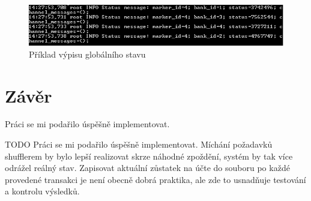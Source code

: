 \documentclass[11pt,a4paper]{scrartcl}
\begin{document}
	\begin{figure}[H]
		\centering
		\includegraphics[width=15cm]{img/global-state.png}
		\caption{Příklad výpisu globálního stavu}
		\label{fig:global-state}
	\end{figure}
	
	\section{Závěr}
	Práci se mi podařilo úspěšně implementovat.
	
	TODO
	Práci se mi podařilo úspěšně implementovat. Míchání požadavků shufflerem by bylo lepší realizovat skrze náhodné zpoždění, systém by tak více odrážel reálný stav. Zapisovat aktuální zůstatek na účte do souboru po každé provedené transakci je není obecně dobrá praktika, ale zde to usnadňuje testování a kontrolu výsledků.
	
\end{document}

